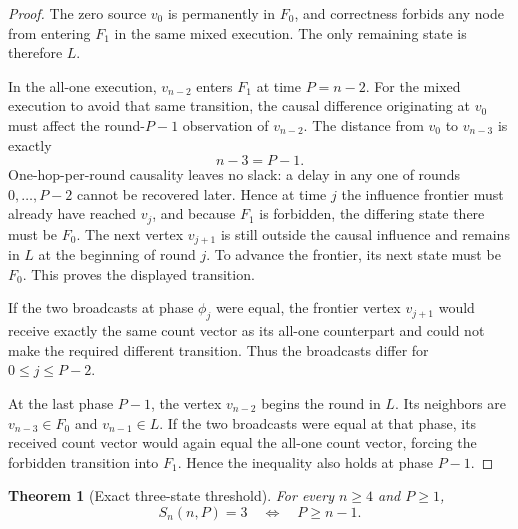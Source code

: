 \documentclass[11pt]{article}
\newtheorem{theorem}{Theorem}
\theoremstyle{remark}
\newcommand{\Fzero}{F_0}
\newcommand{\Fone}{F_1}
\newcommand{\Live}{L}
\begin{document}
\begin{proof}
The zero source $v_0$ is permanently in $\Fzero$, and correctness forbids any
node from entering $\Fone$ in the same mixed execution.  The only remaining
state is therefore $\Live$.

In the all-one execution, $v_{n-2}$ enters $\Fone$ at time $P=n-2$.
For the mixed execution to avoid that same transition, the causal difference
originating at $v_0$ must affect the round-$P-1$ observation of $v_{n-2}$.
The distance from $v_0$ to $v_{n-3}$ is exactly
\[
n-3=P-1.
\]
One-hop-per-round causality leaves no slack: a delay in any one of rounds
$0,\ldots,P-2$ cannot be recovered later.  Hence at time $j$ the influence
frontier must already have reached $v_j$, and because $\Fone$ is forbidden,
the differing state there must be $\Fzero$.  The next vertex $v_{j+1}$ is
still outside the causal influence and remains in $\Live$ at the beginning
of round $j$.  To advance the frontier, its next state must be $\Fzero$.
This proves the displayed transition.

If the two broadcasts at phase $\phi_j$ were equal, the frontier vertex
$v_{j+1}$ would receive exactly the same count vector as its all-one
counterpart and could not make the required different transition.  Thus the
broadcasts differ for $0\le j\le P-2$.

At the last phase $P-1$, the vertex $v_{n-2}$ begins the round in $\Live$.
Its neighbors are $v_{n-3}\in\Fzero$ and $v_{n-1}\in\Live$.  If the two
broadcasts were equal at that phase, its received count vector would again
equal the all-one count vector, forcing the forbidden transition into
$\Fone$.  Hence the inequality also holds at phase $P-1$.
\end{proof}

\begin{theorem}[Exact three-state threshold]
For every $n\ge4$ and $P\ge1$,
\[
\boxed{
S_n(n,P)=3
\quad\Longleftrightarrow\quad
P\ge n-1.
}
\]
\end{theorem}
\end{document}

